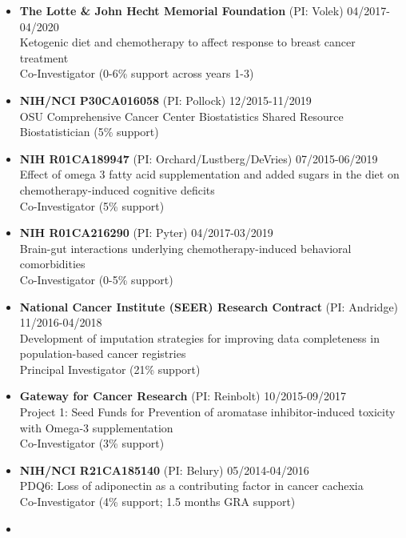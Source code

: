 \documentclass[
  english,
  letterpaper,
  DIV=11,
  numbers=noendperiod]{scrartcl}
\begin{document}
\begin{itemize}
  Influences\\
  Co-Investigator (9\% support)
\item
  \textbf{The Lotte \& John Hecht Memorial Foundation} (PI: Volek)
  {04/2017-04/2020}\\
  Ketogenic diet and chemotherapy to affect response to breast cancer
  treatment\\
  Co-Investigator (0-6\% support across years 1-3)
\item
  \textbf{NIH/NCI P30CA016058} (PI: Pollock) {12/2015-11/2019}\\
  OSU Comprehensive Cancer Center Biostatistics Shared Resource\\
  Biostatistician (5\% support)\\
\item
  \textbf{NIH R01CA189947} (PI: Orchard/Lustberg/DeVries)
  {07/2015-06/2019}\\
  Effect of omega 3 fatty acid supplementation and added sugars in the
  diet on chemotherapy-induced cognitive deficits\\
  Co-Investigator (5\% support)\\
\item
  \textbf{NIH R01CA216290} (PI: Pyter) {04/2017-03/2019}\\
  Brain-gut interactions underlying chemotherapy-induced behavioral
  comorbidities\\
  Co-Investigator (0-5\% support)\\
\item
  \textbf{National Cancer Institute (SEER) Research Contract} (PI:
  Andridge) {11/2016-04/2018}\\
  Development of imputation strategies for improving data completeness
  in population-based cancer registries\\
  Principal Investigator (21\% support)
\item
  \textbf{Gateway for Cancer Research} (PI: Reinbolt)
  {10/2015-09/2017}\\
  Project 1: Seed Funds for Prevention of aromatase inhibitor-induced
  toxicity with Omega-3 supplementation\\
  Co-Investigator (3\% support)
\item
  \textbf{NIH/NCI R21CA185140} (PI: Belury) {05/2014-04/2016}\\
  PDQ6: Loss of adiponectin as a contributing factor in cancer
  cachexia\\
  Co-Investigator (4\% support; 1.5 months GRA support)
\item

\end{itemize}
\end{document}
